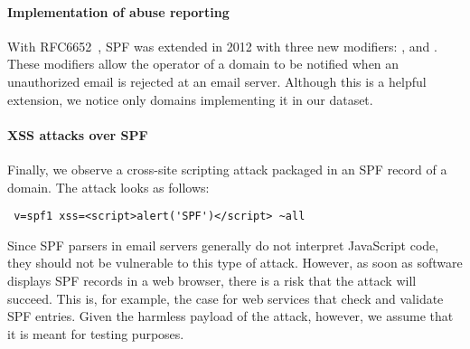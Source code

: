 \paragraph{Implementation of abuse reporting}
With RFC6652~\citep{rfc6652}, SPF was extended in 2012 with three new modifiers: ,  and . These modifiers allow the operator of a domain to be notified when an unauthorized email is rejected at an email server. Although this is a helpful extension, we notice only \numprint{\ReportMechanism} domains implementing it in our dataset.

\paragraph{XSS attacks over SPF}
Finally, we observe a cross-site scripting attack packaged in an SPF record of a domain. The attack looks as follows:
\begin{center}
\color{cbone}
\begin{verbatim}
 v=spf1 xss=<script>alert('SPF')</script> ~all
\end{verbatim}
\end{center}
Since SPF parsers in email servers generally do not interpret JavaScript code, they should not be vulnerable to this type of attack.
However, as soon as software displays SPF records in a web browser, there is a risk that the attack will succeed.
This is, for example, the case for web services that check and validate SPF entries. Given the harmless payload of the attack, however, we assume that it is meant for testing purposes.
 
